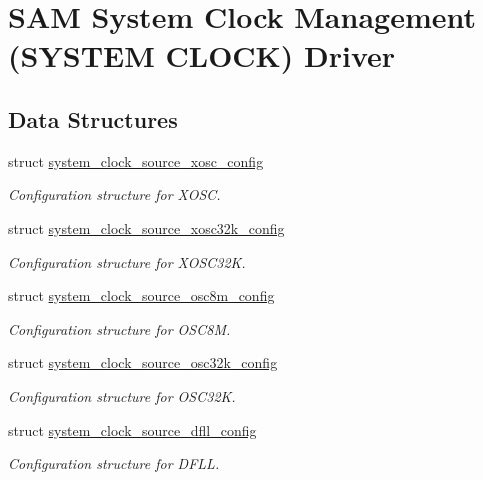 \hypertarget{group__asfdoc__sam0__system__clock__group}{}\section{S\+AM System Clock Management (S\+Y\+S\+T\+EM C\+L\+O\+CK) Driver}
\label{group__asfdoc__sam0__system__clock__group}
\subsection*{Data Structures}
\begin{DoxyCompactItemize}
\item 
struct \mbox{\hyperlink{structsystem__clock__source__xosc__config}{system\+\_\+clock\+\_\+source\+\_\+xosc\+\_\+config}}
\begin{DoxyCompactList}\small\item\em Configuration structure for X\+O\+SC. \end{DoxyCompactList}\item 
struct \mbox{\hyperlink{structsystem__clock__source__xosc32k__config}{system\+\_\+clock\+\_\+source\+\_\+xosc32k\+\_\+config}}
\begin{DoxyCompactList}\small\item\em Configuration structure for X\+O\+S\+C32K. \end{DoxyCompactList}\item 
struct \mbox{\hyperlink{structsystem__clock__source__osc8m__config}{system\+\_\+clock\+\_\+source\+\_\+osc8m\+\_\+config}}
\begin{DoxyCompactList}\small\item\em Configuration structure for O\+S\+C8M. \end{DoxyCompactList}\item 
struct \mbox{\hyperlink{structsystem__clock__source__osc32k__config}{system\+\_\+clock\+\_\+source\+\_\+osc32k\+\_\+config}}
\begin{DoxyCompactList}\small\item\em Configuration structure for O\+S\+C32K. \end{DoxyCompactList}\item 
struct \mbox{\hyperlink{structsystem__clock__source__dfll__config}{system\+\_\+clock\+\_\+source\+\_\+dfll\+\_\+config}}
\begin{DoxyCompactList}\small\item\em Configuration structure for D\+F\+LL. \end{DoxyCompactList}\item 

\end{DoxyCompactItemize}
